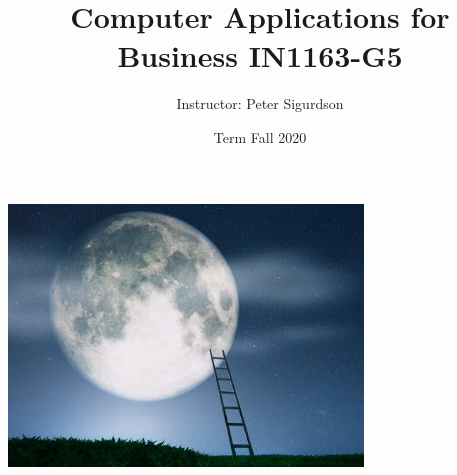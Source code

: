 \documentclass{article}
\title{Computer Applications for Business IN1163-G5}
\author{Instructor: Peter Sigurdson }
\date{Term Fall 2020}
\begin{document}
\maketitle

\begin{center}
\centerline{\includegraphics[scale=2]{reachForTheMoon.jpg}}
\end{center}






\end{document}
